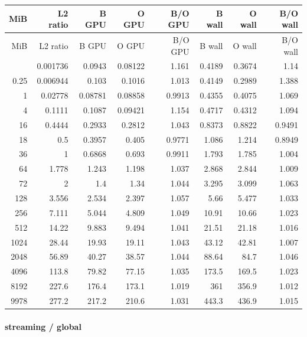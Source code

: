 \begingroup
\scriptsize
\setlength{\tabcolsep}{2.5pt}
\renewcommand{\arraystretch}{1.16}
\begin{longtable}{rrrrrrrr}
\toprule
MiB & L2 ratio & B GPU & O GPU & B/O GPU & B wall & O wall & B/O wall \\
\midrule\endfirsthead
\toprule
MiB & L2 ratio & B GPU & O GPU & B/O GPU & B wall & O wall & B/O wall \\
\midrule\endhead
\bottomrule\endfoot
0.0625 & 0.001736 & 0.0943 & 0.08122 & 1.161 & 0.4189 & 0.3674 & 1.14 \\
0.25 & 0.006944 & 0.103 & 0.1016 & 1.013 & 0.4149 & 0.2989 & 1.388 \\
1 & 0.02778 & 0.08781 & 0.08858 & 0.9913 & 0.4355 & 0.4075 & 1.069 \\
4 & 0.1111 & 0.1087 & 0.09421 & 1.154 & 0.4717 & 0.4312 & 1.094 \\
16 & 0.4444 & 0.2933 & 0.2812 & 1.043 & 0.8373 & 0.8822 & 0.9491 \\
18 & 0.5 & 0.3957 & 0.405 & 0.9771 & 1.086 & 1.214 & 0.8949 \\
36 & 1 & 0.6868 & 0.693 & 0.9911 & 1.793 & 1.785 & 1.004 \\
64 & 1.778 & 1.243 & 1.198 & 1.037 & 2.868 & 2.844 & 1.009 \\
72 & 2 & 1.4 & 1.34 & 1.044 & 3.295 & 3.099 & 1.063 \\
128 & 3.556 & 2.534 & 2.397 & 1.057 & 5.66 & 5.477 & 1.033 \\
256 & 7.111 & 5.044 & 4.809 & 1.049 & 10.91 & 10.66 & 1.023 \\
512 & 14.22 & 9.883 & 9.494 & 1.041 & 21.51 & 21.18 & 1.016 \\
1024 & 28.44 & 19.93 & 19.11 & 1.043 & 43.12 & 42.81 & 1.007 \\
2048 & 56.89 & 40.27 & 38.57 & 1.044 & 88.64 & 84.7 & 1.046 \\
4096 & 113.8 & 79.82 & 77.15 & 1.035 & 173.5 & 169.5 & 1.023 \\
8192 & 227.6 & 176.4 & 173.1 & 1.019 & 361 & 356.9 & 1.012 \\
9978 & 277.2 & 217.2 & 210.6 & 1.031 & 443.3 & 436.9 & 1.015 \\
\end{longtable}
\endgroup


\paragraph{streaming / global}

